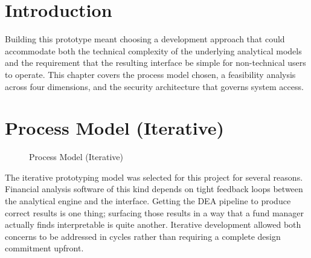 \documentclass[12pt,a4paper]{report}
\begin{document}
\section{Introduction}

Building this prototype meant choosing a development approach that could accommodate both
the technical complexity of the underlying analytical models and the requirement that the
resulting interface be simple for non-technical users to operate. This chapter covers the
process model chosen, a feasibility analysis across four dimensions, and the security
architecture that governs system access.

\section{Process Model (Iterative)}

\begin{figure}[H]
\centering
{}
\caption{Process Model (Iterative)}
\label{fig:process_model}
\end{figure}

The iterative prototyping model was selected for this project for several reasons.
Financial analysis software of this kind depends on tight feedback loops between the
analytical engine and the interface. Getting the DEA pipeline to produce correct results is
one thing; surfacing those results in a way that a fund manager actually finds interpretable
is quite another. Iterative development allowed both concerns to be addressed in cycles
rather than requiring a complete design commitment upfront.
\end{document}
